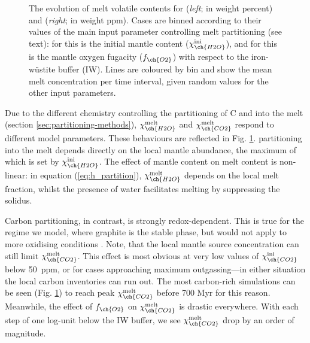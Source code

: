 \begin{figure}%
    \centering
    \qquad
    \caption[Modelled evolution of melt volatile contents for  and  for Archean Earth.]{The evolution of melt volatile contents for  (\textit{left}; in weight percent) and  (\textit{right}; in weight ppm). Cases are binned according to their values of the main input parameter controlling melt partitioning (see text): for  this is the initial mantle  content ($\chi_{\ch{H2O}}^{\rm{ini}}$), and for  this is the mantle oxygen fugacity ($f_{\ch{O2}}$) with respect to the iron-w\"ustite buffer (IW). Lines are coloured by bin and show the mean melt concentration per time interval, given random values for the other input parameters.}%
    \label{fig:X_melt}%
\end{figure}






Due to the different chemistry controlling the partitioning of C and  into the melt (section \ref{sec:partitioning-methods}), $\chi_{\ch{H2O}}^{\rm melt}$ and $\chi_{\ch{CO2}}^{\rm melt}$ respond to different model parameters. These behaviours are reflected in Fig. \ref{fig:X_melt}.  partitioning into the melt depends directly on the local mantle  abundance, the maximum of which is set by $\chi_{\ch{H2O}}^{\rm ini}$. The effect of mantle content on melt content is non-linear: in equation (\ref{eq:h_partition}), $\chi_{\ch{H2O}}^{\rm melt}$ depends on the local melt fraction, whilst the presence of water facilitates melting by suppressing the solidus.


Carbon partitioning, in contrast, is strongly redox-dependent. This is true for the regime we model, where graphite is the stable phase, but would not apply to more oxidising conditions \citep{Stagno2019}. Note, that the local mantle source  concentration can still limit $\chi_{\ch{CO2}}^{\rm melt}$. This effect is most obvious at very low values of $\chi_{\ch{CO2}}^{\rm ini}$ below 50~ppm, or for cases approaching maximum outgassing---in either situation the local carbon inventories can run out. The most carbon-rich simulations can be seen (Fig. \ref{fig:X_melt}) to reach peak $\chi_{\ch{CO2}}^{\rm melt}$ before 700 Myr for this reason. Meanwhile, the effect of $f_{\ch{O2}}$ on $\chi_{\ch{CO2}}^{\rm melt}$ is drastic everywhere. With each step of one log-unit below the IW buffer, we see $\chi_{\ch{CO2}}^{\rm melt}$ drop by an order of magnitude.

